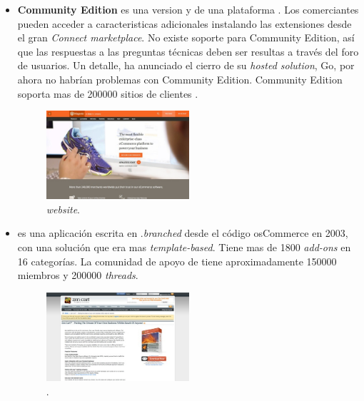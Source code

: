 \begin{itemize}
	\item \textbf{\nameMagento Community Edition} es una version \free y \opensource de  una plataforma \ecommerce. Los comerciantes pueden acceder a caracteristicas adicionales instalando las extensiones desde el gran \textit{\nameMagento Connect marketplace}. No existe soporte para \nameMagento Community Edition, así que las respuestas a las preguntas técnicas deben ser resultas a través del foro de usuarios. Un detalle, \nameMagento ha anunciado el cierro de su \textit{hosted solution}, \nameMagento Go, por ahora no habrían problemas con Community Edition. \nameMagento Community Edition soporta mas de 200000 sitios de clientes .

	\begin{figure}[h!]
		\centering
		\includegraphics[width=0.5\textwidth]{figuras/cap1/MagentoWebsite.jpg}
		\caption{\nameMagento \textit{website}\cite{online_Magento}.}
	\end{figure}


	\item \textbf{\nameZenCart} es una aplicación \ecommerce \opensource escrita en \php.\nameZenCart \textit{branched} desde el código osCommerce en 2003, con una solución que era mas \textit{template-based}. Tiene mas de 1800 \textit{add-ons} en 16 categorías. La comunidad de apoyo de \nameZenCart tiene aproximadamente 150000 miembros y 200000 \textit{threads}.

	\begin{figure}[h!]
		\centering
		\includegraphics[width=0.5\textwidth]{figuras/cap1/ZenCartWebsite.jpg}
		\caption{\nameZenCart \website\cite{online_ZenCart}.}
	\end{figure}



\end{itemize}
